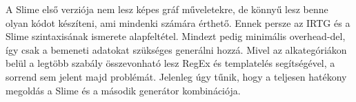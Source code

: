 A Slime első verziója nem lesz képes gráf műveletekre, de könnyű lesz benne olyan kódot készíteni, ami mindenki számára érthető.
Ennek persze az IRTG és a Slime szintaxisának ismerete alapfeltétel. 
Mindezt pedig minimális overhead-del, így csak a bemeneti adatokat szükséges generálni hozzá. 
Mivel az alkategóriákon belül a legtöbb szabály összevonható lesz RegEx és templatelés segítségével, a sorrend sem jelent majd problémát.
Jelenleg úgy tűnik, hogy a teljesen hatékony megoldás a Slime és a második generátor kombinációja.
